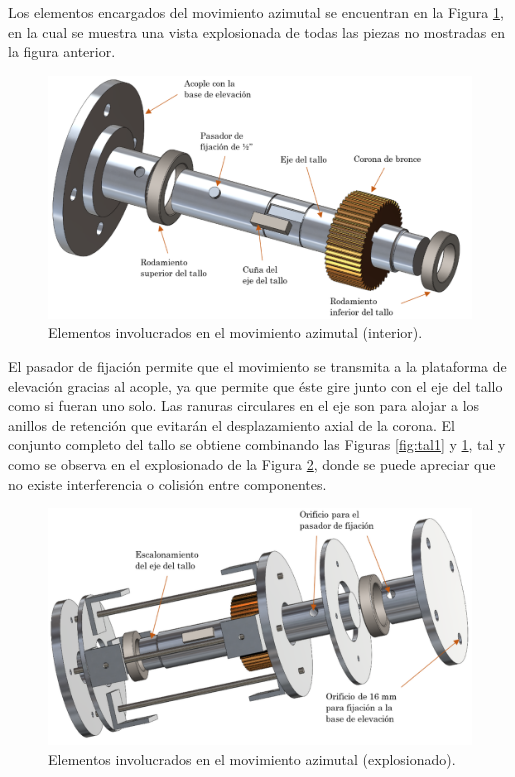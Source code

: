 \newpage
Los elementos encargados del movimiento azimutal se encuentran en la Figura \ref{fig:tal2}, en la cual se muestra una vista explosionada de todas las piezas no mostradas en la figura anterior.
\begin{figure}[H]
	\centering
	\includegraphics[width=12cm]{imagenes/tal2}
	\caption{Elementos involucrados en el movimiento azimutal (interior).}
	\label{fig:tal2}
\end{figure}

El pasador de fijación permite que el movimiento se transmita a la plataforma de elevación gracias al acople, ya que permite que éste gire junto con el eje del tallo como si fueran uno solo. Las ranuras circulares en el eje son para alojar a los anillos de retención que evitarán el desplazamiento axial de la corona. El conjunto completo del tallo se obtiene combinando las Figuras \ref{fig:tal1} y \ref{fig:tal2}, tal y como se observa en el explosionado de la Figura \ref{fig:tal3}, donde se puede apreciar que no existe interferencia o colisión entre componentes. 
\begin{figure}[H]
	\centering
	\includegraphics[width=11.5cm]{imagenes/tal3}
	\caption{Elementos involucrados en el movimiento azimutal (explosionado).}
	\label{fig:tal3}
\end{figure}

